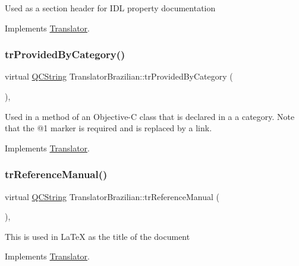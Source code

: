 Used as a section header for I\+DL property documentation 

Implements \mbox{\hyperlink{class_translator}{Translator}}.

\mbox{\label{class_translator_brazilian_aa35cf5921996a47d4a623c42fb9b5bc8}} 
\subsubsection{\texorpdfstring{trProvidedByCategory()}{trProvidedByCategory()}}
{\footnotesize\ttfamily virtual \mbox{\hyperlink{class_q_c_string}{Q\+C\+String}} Translator\+Brazilian\+::tr\+Provided\+By\+Category (\begin{DoxyParamCaption}{ }\end{DoxyParamCaption})\hspace{0.3cm}{\ttfamily [inline]}, {\ttfamily [virtual]}}

Used in a method of an Objective-\/C class that is declared in a a category. Note that the @1 marker is required and is replaced by a link. 

Implements \mbox{\hyperlink{class_translator}{Translator}}.

\mbox{\label{class_translator_brazilian_a84ac00adbff337f8a765ec25f20d12d3}} 
\subsubsection{\texorpdfstring{trReferenceManual()}{trReferenceManual()}}
{\footnotesize\ttfamily virtual \mbox{\hyperlink{class_q_c_string}{Q\+C\+String}} Translator\+Brazilian\+::tr\+Reference\+Manual (\begin{DoxyParamCaption}{ }\end{DoxyParamCaption})\hspace{0.3cm}{\ttfamily [inline]}, {\ttfamily [virtual]}}

This is used in La\+TeX as the title of the document 

Implements \mbox{\hyperlink{class_translator}{Translator}}.

